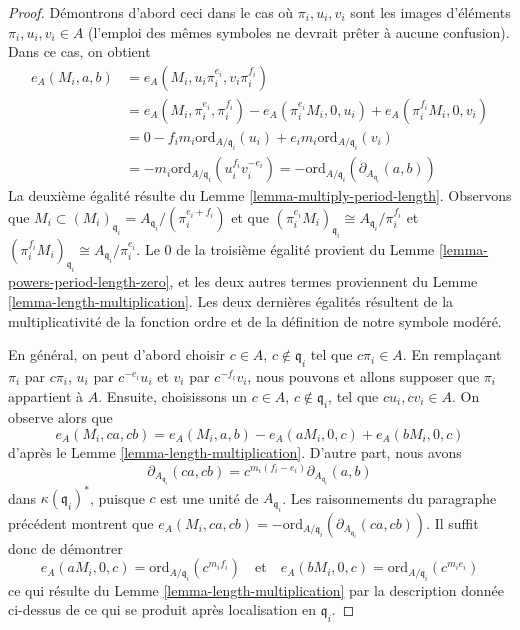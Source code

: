\begin{proof}
\medskip\noindent
Démontrons d'abord ceci dans le cas où $\pi_i, u_i, v_i$ sont les images
d'éléments $\pi_i, u_i, v_i \in A$ (l'emploi des mêmes symboles
ne devrait prêter à aucune confusion). Dans ce cas, on obtient
\begin{align*}
e_A(M_i, a, b) & =
e_A(M_i, u_i\pi_i^{e_i}, v_i\pi_i^{f_i}) \\
& =
e_A(M_i, \pi_i^{e_i}, \pi_i^{f_i}) -
e_A(\pi_i^{e_i}M_i, 0, u_i) +
e_A(\pi_i^{f_i}M_i, 0, v_i) \\
& =
0 -
f_im_i\text{ord}_{A/\mathfrak q_i}(u_i) +
e_im_i\text{ord}_{A/\mathfrak q_i}(v_i) \\
& =
-m_i\text{ord}_{A/\mathfrak q_i}(u_i^{f_i}v_i^{-e_i}) =
-\text{ord}_{A/\mathfrak q_i}(\partial_{A_{\mathfrak q_i}}(a, b))
\end{align*}
La deuxième égalité résulte du Lemme \ref{lemma-multiply-period-length}.
Observons que
$M_i \subset (M_i)_{\mathfrak q_i} = A_{\mathfrak q_i}/(\pi_i^{e_i + f_i})$
et que
$(\pi_i^{e_i}M_i)_{\mathfrak q_i} \cong A_{\mathfrak q_i}/\pi_i^{f_i}$ et
$(\pi_i^{f_i}M_i)_{\mathfrak q_i} \cong A_{\mathfrak q_i}/\pi_i^{e_i}$.
Le $0$ de la troisième égalité provient du
Lemme \ref{lemma-powers-period-length-zero},
et les deux autres termes proviennent du
Lemme \ref{lemma-length-multiplication}.
Les deux dernières égalités résultent de la multiplicativité de
la fonction ordre et de la définition de notre symbole modéré.

\medskip\noindent
En général, on peut d'abord choisir $c \in A$, $c \not \in \mathfrak q_i$
tel que $c\pi_i \in A$. En remplaçant $\pi_i$ par $c\pi_i$,
$u_i$ par $c^{-e_i}u_i$ et $v_i$ par $c^{-f_i}v_i$,
nous pouvons et allons supposer que $\pi_i$ appartient à $A$.
Ensuite, choisissons un $c \in A$, $c \not \in \mathfrak q_i$,
tel que $cu_i, cv_i \in A$. On observe alors que
$$
e_A(M_i, ca, cb) = e_A(M_i, a, b) - e_A(aM_i, 0, c) + e_A(bM_i, 0, c)
$$
d'après le Lemme \ref{lemma-length-multiplication}.
D'autre part, nous avons
$$
\partial_{A_{\mathfrak q_i}}(ca, cb) =
c^{m_i(f_i - e_i)}\partial_{A_{\mathfrak q_i}}(a, b)
$$
dans $\kappa(\mathfrak q_i)^*$, puisque $c$ est une unité de $A_{\mathfrak q_i}$.
Les raisonnements du paragraphe précédent montrent que
$e_A(M_i, ca, cb) = -
\text{ord}_{A/\mathfrak q_i}(\partial_{A_{\mathfrak q_i}}(ca, cb))$.
Il suffit donc de démontrer
$$
e_A(aM_i, 0, c) = \text{ord}_{A/\mathfrak q_i}(c^{m_if_i})
\quad\text{et}\quad
e_A(bM_i, 0, c) = \text{ord}_{A/\mathfrak q_i}(c^{m_ie_i})
$$
ce qui résulte du Lemme \ref{lemma-length-multiplication}
par la description donnée ci-dessus de ce qui se produit
après localisation en $\mathfrak q_i$.
\end{proof}

